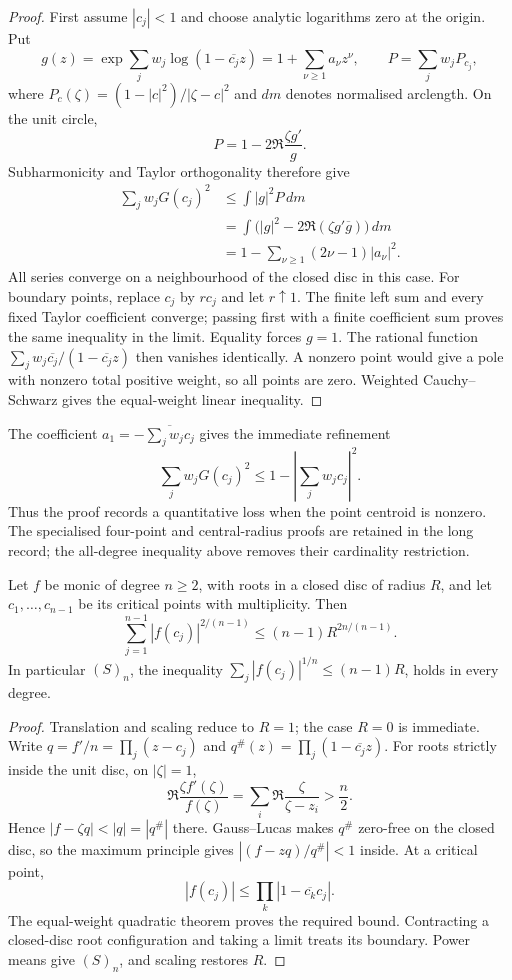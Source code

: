 \documentclass[11pt]{article}
\begin{document}
\begin{proof}
First assume $|c_j|<1$ and choose analytic logarithms zero at the origin.
Put
\[
 g(z)=\exp\sum_jw_j\log(1-\overline{c_j}z)
      =1+\sum_{\nu\ge1}a_\nu z^\nu,
 \qquad P=\sum_jw_jP_{c_j},
\]
where $P_c(\zeta)=(1-|c|^2)/|\zeta-c|^2$ and $dm$ denotes normalised
arclength.  On the unit circle,
\[
 P=1-2\Re\frac{\zeta g'}g.
\]
Subharmonicity and Taylor orthogonality therefore give
\begin{align*}
 \sum_jw_jG(c_j)^2
 &\le\int |g|^2P\,dm\\
 &=\int\bigl(|g|^2-2\Re(\zeta g'\overline g)\bigr)\,dm\\
 &=1-\sum_{\nu\ge1}(2\nu-1)|a_\nu|^2.
\end{align*}
All series converge on a neighbourhood of the closed disc in this case.
For boundary points, replace $c_j$ by $rc_j$ and let $r\uparrow1$.
The finite left sum and every fixed Taylor coefficient converge; passing
first with a finite coefficient sum proves the same inequality in the limit.
Equality forces $g=1$.  The rational function
$\sum_jw_j\overline{c_j}/(1-\overline{c_j}z)$ then vanishes identically.
A nonzero point would give a pole with nonzero total positive weight, so all
points are zero.  Weighted Cauchy--Schwarz gives the equal-weight linear
inequality.
\end{proof}

The coefficient $a_1=-\overline{\sum_jw_jc_j}$ gives the immediate refinement
\[
 \sum_jw_jG(c_j)^2\le1-\left|\sum_jw_jc_j\right|^2.
\]
Thus the proof records a quantitative loss when the point centroid is nonzero.
The specialised four-point and central-radius proofs are retained in the long
record; the all-degree inequality above removes their cardinality restriction.

\begin{theorem}\label{res:fp-to-s}
Let $f$ be monic of degree $n\ge2$, with roots in a closed disc of radius
$R$, and let $c_1,\ldots,c_{n-1}$ be its critical points with multiplicity.
Then
\[
 \sum_{j=1}^{n-1}|f(c_j)|^{2/(n-1)}
 \le(n-1)R^{2n/(n-1)}.
\]
In particular $(S)_n$, the inequality
$\sum_j|f(c_j)|^{1/n}\le(n-1)R$, holds in every degree.
\end{theorem}

\begin{proof}
Translation and scaling reduce to $R=1$; the case $R=0$ is immediate.
Write $q=f'/n=\prod_j(z-c_j)$ and
$q^\#(z)=\prod_j(1-\overline{c_j}z)$.
For roots strictly inside the unit disc, on $|\zeta|=1$,
\[
 \Re\frac{\zeta f'(\zeta)}{f(\zeta)}
 =\sum_i\Re\frac{\zeta}{\zeta-z_i}>\frac n2.
\]
Hence $|f-\zeta q|<|q|=|q^\#|$ there.  Gauss--Lucas makes $q^\#$ zero-free
on the closed disc, so the maximum principle gives
$|(f-zq)/q^\#|<1$ inside.  At a critical point,
\[
 |f(c_j)|\le\prod_k|1-\overline{c_k}c_j|.
\]
The equal-weight quadratic theorem proves the required bound.
Contracting a closed-disc root configuration and taking a limit treats its
boundary.  Power means give $(S)_n$, and scaling restores $R$.
\end{proof}
\end{document}
